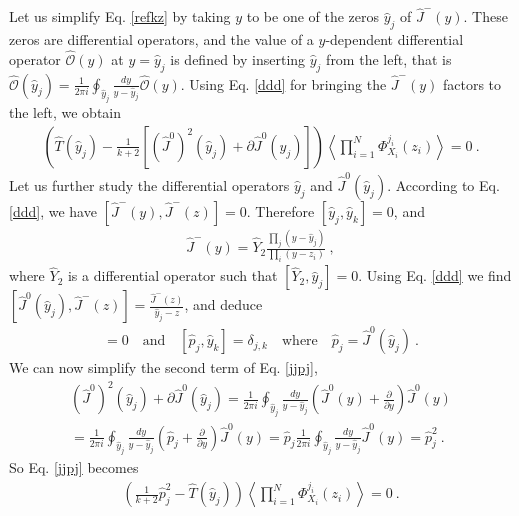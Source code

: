 \documentclass[12pt, a4paper, notitlepage, twoside]{report}
\numberwithin{equation}{section}
\theoremstyle{break}
\begin{document}
Let us simplify Eq. \eqref{refkz} by taking $y$ to be one of the zeros $\hat{y}_j$ of $ \hat{J}^-(y)$.
These zeros are differential operators, and the value of a $y$-dependent differential operator $\hat{\mathcal{O}}(y)$ at $y=\hat{y}_j$ is defined by inserting $\hat{y}_j$ from the left, that is $ \hat{\mathcal{O}}(\hat{y}_j) = \frac{1}{2\pi i}\oint_{\hat{y}_j} \frac{dy}{y-\hat{y}_j} \hat{\mathcal{O}}(y) $.
Using Eq. \eqref{ddd} for bringing the $\hat{J}^-(y)$ factors to the left, we obtain
\begin{align}
 \left( \hat{T}(\hat{y}_j) -\frac{1}{k+2}\left[(\hat{J}^0)^2(\hat{y}_j) + \partial \hat{J}^0(\hat{y}_j)\right] \right)  \left\langle \prod_{i=1}^N \Phi^{j_i}_{X_i}(z_i)\right\rangle= 0 \ .
\label{jjpj}
\end{align}
Let us further study the differential operators $\hat{y}_j$ and $\hat{J}^0(\hat{y}_j)$.
According to Eq. \eqref{ddd}, we have $[\hat{J}^-(y),\hat{J}^-(z)]=0$.
Therefore $[\hat{y}_j,\hat{y}_k]=0$, and
\begin{align}
 \boxed{\hat{J}^-(y)  = \hat{Y}_2 \frac{\prod_{j}(y-\hat{y}_j)}{\prod_i(y-z_i)}}\ ,
\label{djm}
\end{align}
where $\hat{Y}_2$ is a differential operator such that $[\hat{Y}_2,\hat{y}_j]=0$.
Using Eq. \eqref{ddd} we find $[\hat{J}^0(\hat{y}_j),\hat{J}^-(z)] = \frac{\hat{J}^-(z)}{\hat{y}_j-z}$, and deduce
\begin{align}
 [\hat{p}_j,\hat{Y}_2]=0 \quad \text{and} \quad [\hat{p}_j,\hat{y}_k]=\delta_{j,k} \quad \text{where} \quad \hat{p}_j = \hat{J}^0(\hat{y}_j)\ .
\label{pyd}
\end{align}
We can now simplify the second term of Eq. \eqref{jjpj},
\begin{multline}
 (\hat{J}^0)^2(\hat{y}_j) + \partial \hat{J}^0(\hat{y}_j) = \frac{1}{2\pi i} \oint_{\hat{y}_j} \frac{dy}{y-\hat{y}_j}\left(\hat{J}^0(y) +{\frac{\partial}{\partial y}} \right) \hat{J}^0(y) \\
 = \frac{1}{2\pi i} \oint_{\hat{y}_j} \frac{dy}{y-\hat{y}_j}\left(\hat{p}_j +{\frac{\partial}{\partial y}} \right) \hat{J}^0(y)
 = \hat{p}_j \frac{1}{2\pi i} \oint_{\hat{y}_j} \frac{dy}{y-\hat{y}_j} \hat{J}^0(y) = \hat{p}_j^2\ .
\end{multline}
So Eq. \eqref{jjpj} becomes 
\begin{align}
 \boxed{\left(\frac{1}{k+2}\hat{p}_j^2 -\hat{T}(\hat{y}_j)\right) \left\langle \prod_{i=1}^N \Phi^{j_i}_{X_i}(z_i)\right\rangle= 0 }\ .
\label{ppdz}
\end{align}
\end{document}
